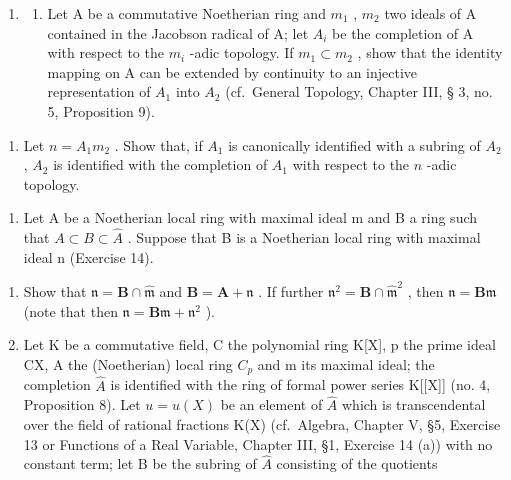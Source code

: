 \begin{enumerate}
\def\labelenumi{\arabic{enumi}.}
\setcounter{enumi}{11}
\tightlist
\item
  \begin{enumerate}
  \def\labelenumii{(\alph{enumii})}
  \tightlist
  \item
    Let A be a commutative Noetherian ring and \(m_{1}\) , \(m_{2}\) two ideals of A contained in the Jacobson radical of A; let \(A_{i}\) be the completion of A with respect to the \(m_{i}\) -adic topology. If \(m_{1} \subset m_{2}\) , show that the identity mapping on A can be extended by continuity to an injective representation of \(A_{1}\) into \(A_{2}\) (cf.~General Topology, Chapter III, § 3, no. 5, Proposition 9).
  \end{enumerate}
\end{enumerate}

\begin{enumerate}
\def\labelenumi{(\alph{enumi})}
\setcounter{enumi}{1}
\tightlist
\item
  Let \(n = A_1 m_2\) . Show that, if \(A_1\) is canonically identified with a subring of \(A_2\) , \(A_2\) is identified with the completion of \(A_1\) with respect to the \(n\) -adic topology.
\end{enumerate}

\begin{enumerate}
\def\labelenumi{\arabic{enumi}.}
\setcounter{enumi}{12}
\tightlist
\item
  Let A be a Noetherian local ring with maximal ideal m and B a ring such that \(A \subset B \subset \hat{A}\) . Suppose that B is a Noetherian local ring with maximal ideal n (Exercise 14).
\end{enumerate}

\begin{enumerate}
\def\labelenumi{(\alph{enumi})}
\item
  Show that \(\mathfrak{n} = \mathbf{B} \cap \hat{\mathfrak{m}}\) and \(\mathbf{B} = \mathbf{A} + \mathfrak{n}\) . If further \(\mathfrak{n}^2 = \mathbf{B} \cap \hat{\mathfrak{m}}^2\) , then \(\mathfrak{n} = \mathbf{B}\mathfrak{m}\) (note that then \(\mathfrak{n} = \mathbf{B}\mathfrak{m} + \mathfrak{n}^2\) ).
\item
  Let K be a commutative field, C the polynomial ring K{[}X{]}, p the prime ideal CX, A the (Noetherian) local ring \(C_{p}\) and m its maximal ideal; the completion \(\hat{A}\) is identified with the ring of formal power series K{[}{[}X{]}{]} (no. 4, Proposition 8). Let \(u = u(X)\) be an element of \(\hat{A}\) which is transcendental over the field of rational fractions K(X) (cf.~Algebra, Chapter V, §5, Exercise 13 or Functions of a Real Variable, Chapter III, §1, Exercise 14 (a)) with no constant term; let B be the subring of \(\hat{A}\) consisting of the quotients
\end{enumerate}

